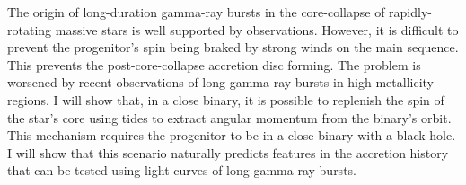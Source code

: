 


\bigskip



\bigskip

\noindent The origin of long-duration gamma-ray bursts in the core-collapse of
rapidly-rotating massive stars is well supported by observations. However, it is difficult to prevent the progenitor's spin being braked by strong winds on the main sequence.  This prevents the post-core-collapse accretion disc forming.  The problem is worsened by recent observations of long gamma-ray bursts in high-metallicity regions.  I will show that, in a close binary, it is possible to replenish the spin of the star's core using tides to extract angular momentum from the binary's orbit.  This mechanism requires the progenitor to be in a close binary with a black hole.  I will show that this scenario naturally predicts features in the accretion history that can be tested using light curves of long gamma-ray bursts.

